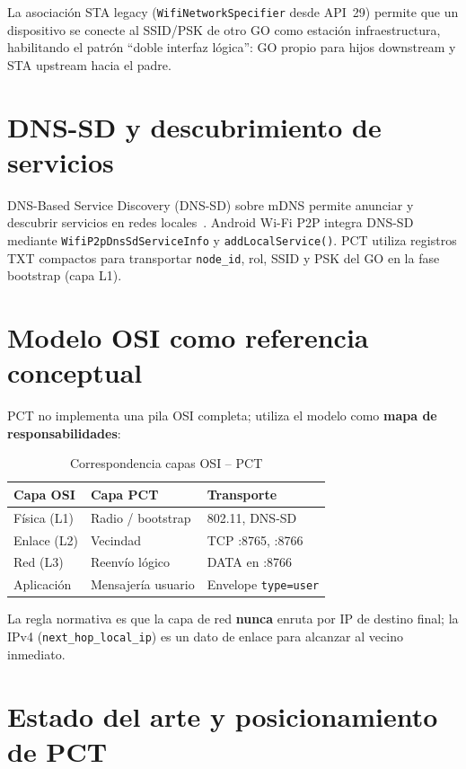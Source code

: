 La asociación STA legacy (\texttt{WifiNetworkSpecifier} desde API~29) permite que un dispositivo se conecte al SSID/PSK de otro GO como estación infraestructura, habilitando el patrón ``doble interfaz lógica'': GO propio para hijos downstream y STA upstream hacia el padre.

\section{DNS-SD y descubrimiento de servicios}
\label{sec:dns-sd}

DNS-Based Service Discovery (DNS-SD) sobre mDNS permite anunciar y descubrir servicios en redes locales~\cite{rfc6763}. Android Wi-Fi P2P integra DNS-SD mediante \texttt{WifiP2pDnsSdServiceInfo} y \texttt{addLocalService()}. PCT utiliza registros TXT compactos para transportar \texttt{node\_id}, rol, SSID y PSK del GO en la fase bootstrap (capa L1).

\section{Modelo OSI como referencia conceptual}
\label{sec:osi-emulado}

PCT no implementa una pila OSI completa; utiliza el modelo como \textbf{mapa de responsabilidades}:

\begin{table}[htbp]
  \centering
  \caption{Correspondencia capas OSI -- PCT}
  \label{tab:osi-pct}
  \begin{tabular}{@{}lll@{}}
    \toprule
    \textbf{Capa OSI} & \textbf{Capa PCT} & \textbf{Transporte} \\
    \midrule
    Física (L1)       & Radio / bootstrap & 802.11, DNS-SD \\
    Enlace (L2)       & Vecindad          & TCP :8765, :8766 \\
    Red (L3)          & Reenvío lógico    & DATA en :8766 \\
    Aplicación        & Mensajería usuario & Envelope \texttt{type=user} \\
    \bottomrule
  \end{tabular}
\end{table}

La regla normativa es que la capa de red \textbf{nunca} enruta por IP de destino final; la IPv4 (\texttt{next\_hop\_local\_ip}) es un dato de enlace para alcanzar al vecino inmediato.

\section{Estado del arte y posicionamiento de PCT}
\label{sec:estado-arte}

